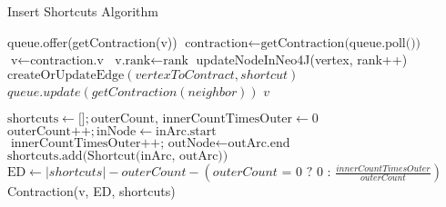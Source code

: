 \begin{algorithm}
    \caption{Insert Shortcuts Algorithm}
    \label{alg:contraction}
    \begin{algorithmic}[1]
        \State queue.offer(getContraction(v))
    \EndFor
    \State $\text{contraction} \gets \text{getContraction(queue.poll())}$
    \State $\text{v} \gets \text{contraction.v}$
    \State $\text{v.rank} \gets \text{rank}$
    \State updateNodeInNeo4J(vertex, rank++)
        \State $\text{createOrUpdateEdge}(vertexToContract, shortcut)$
    \EndFor
        \State $queue.update(getContraction(neighbor))$
    \EndFor
    \State \Return $v$
    \EndWhile
    \EndFunction

    \State$\text{shortcuts} \gets \text{[]}; \text{outerCount, innerCountTimesOuter} \gets 0$
            \State $\text{outerCount++}; \text{inNode} \gets \text{inArc.start}$
                    \State $\text{innerCountTimesOuter++; } \text{outNode} \gets \text{outArc.end}$
                     $\text{shortcuts.add(Shortcut(inArc, outArc))} $ 
                    \EndIf
                \EndIf
            \EndFor
        \EndIf
    \EndFor
    \State $\text{ED} \gets |shortcuts| - outerCount -  (outerCount \text{ = 0 ? 0 : } \frac{innerCountTimesOuter}{outerCount})$
    \State \Return Contraction(v, ED, shortcuts)
    \EndFunction
    \end{algorithmic}
\end{algorithm}